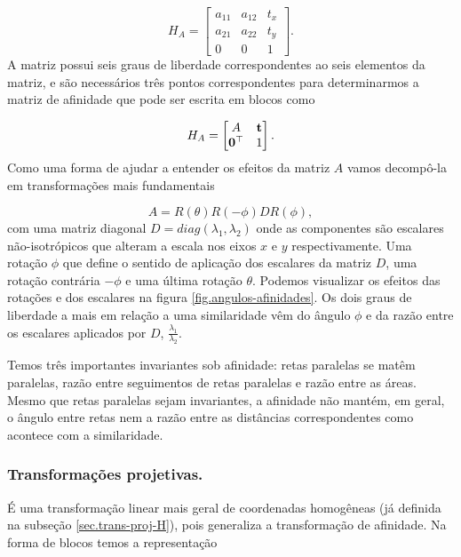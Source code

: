 \begin{equation*}
H_A=
\begin{bmatrix}
a_{11}&a_{12}&t_x\\
a_{21}&a_{22}&t_y\\
0&0&1
\end{bmatrix}.
\end{equation*}
A matriz possui seis graus de liberdade correspondentes ao seis elementos da matriz, e são necessários três pontos correspondentes para determinarmos a matriz de afinidade que pode ser escrita em blocos como

\begin{equation*}
H_A=
\begin{bmatrix}
A&{\bf t}\\
{\bf 0}^\top&1
\end{bmatrix}.
\end{equation*}
Como uma forma de ajudar a entender os efeitos da matriz $A$ vamos decompô-la em transformações mais fundamentais

\begin{equation*}
A=R(\theta)R(-\phi)DR(\phi),
\end{equation*}
com uma matriz diagonal $D=diag(\lambda_1, \lambda_2)$ onde as componentes são escalares não-isotrópicos 
que alteram a escala nos eixos $x$ e $y$ respectivamente. Uma rotação $\phi$ que define o sentido de aplicação dos escalares da matriz $D$, uma rotação contrária $-\phi$ e uma última rotação $\theta$. Podemos visualizar os efeitos das rotações e dos escalares na figura \ref{fig.angulos-afinidades}. Os dois graus de liberdade a mais em relação a uma similaridade vêm do ângulo $\phi$ e da razão entre os escalares aplicados por $D$, $\frac{\lambda_1}{\lambda_2}$. 


Temos três importantes invariantes sob afinidade: retas paralelas se matêm paralelas, razão entre seguimentos de retas paralelas e razão entre as áreas. Mesmo que retas paralelas sejam invariantes, a afinidade não mantém, em geral, o ângulo entre retas nem a razão entre as distâncias correspondentes como acontece com a similaridade.

\subsubsection*{Transformações projetivas.}
É uma transformação linear mais geral de coordenadas homogêneas (já definida na subseção \ref{sec.trans-proj-H}), pois generaliza  a transformação de afinidade. Na forma de blocos temos a representação

